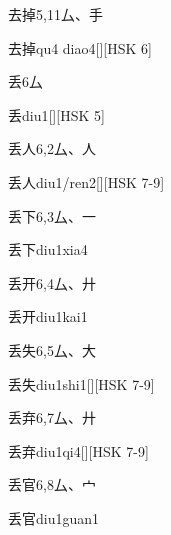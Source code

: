 \begin{Entry}{去掉}{5,11}{⼛、⼿}
  \begin{Phonetics}{去掉}{qu4 diao4}[][HSK 6]
  \end{Phonetics}
\end{Entry}

\begin{Entry}{丢}{6}{⼛}
  \begin{Phonetics}{丢}{diu1}[][HSK 5]
  \end{Phonetics}
\end{Entry}

\begin{Entry}{丢人}{6,2}{⼛、⼈}
  \begin{Phonetics}{丢人}{diu1/ren2}[][HSK 7-9]
  \end{Phonetics}
\end{Entry}

\begin{Entry}{丢下}{6,3}{⼛、⼀}
  \begin{Phonetics}{丢下}{diu1xia4}
  \end{Phonetics}
\end{Entry}

\begin{Entry}{丢开}{6,4}{⼛、⼶}
  \begin{Phonetics}{丢开}{diu1kai1}
  \end{Phonetics}
\end{Entry}

\begin{Entry}{丢失}{6,5}{⼛、⼤}
  \begin{Phonetics}{丢失}{diu1shi1}[][HSK 7-9]
  \end{Phonetics}
\end{Entry}

\begin{Entry}{丢弃}{6,7}{⼛、⼶}
  \begin{Phonetics}{丢弃}{diu1qi4}[][HSK 7-9]
  \end{Phonetics}
\end{Entry}

\begin{Entry}{丢官}{6,8}{⼛、⼧}
  \begin{Phonetics}{丢官}{diu1guan1}
  \end{Phonetics}
\end{Entry}

